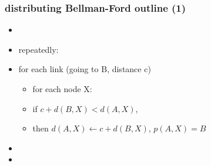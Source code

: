 \usetikzlibrary{arrows.meta,matrix}

\begin{frame}
\frametitle{distributing Bellman-Ford outline (1)}
\begin{itemize}
\item {}
\item repeatedly: 
\item for each link  (going to B, distance c)
    \begin{itemize}
    \item for each node X: 
    \item if $c + d(B, X) < d(A, X)$, \\
    \item then $d(A,X) \leftarrow c+d(B,X)$, $p(A,X) = B$
    \end{itemize}
\vspace{.5cm}
\item<2-> 
\item<3-> 
\end{itemize}
\end{frame}

